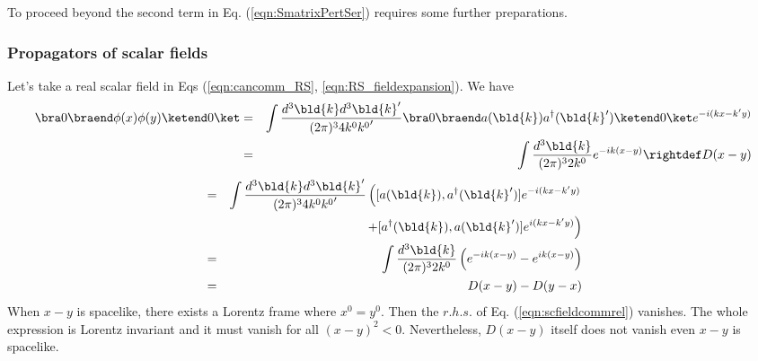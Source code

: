To proceed beyond the second term in Eq. (\ref{eqn:SmatrixPertSer}) requires some
further preparations.

\subsubsection{Propagators of scalar fields}
Let's take a real scalar field in Eqs (\ref{eqn:cancomm_RS}, \ref{eqn:RS_fieldexpansion}).
We have
\begin{eqnarray}
\bra 0 \braend \phi(x) \phi(y) \ketend 0 \ket
&=&
\int \frac{d^3 \bld{k} d^3 \bld{k}'}{(2\pi)^3 4 k^0 {k^0}'} 
\bra 0 \braend a(\bld{k}) a^\dagger(\bld{k}') \ketend 0 \ket
e^{-i(kx - k'y)}
\nonumber\\
&=&
\int \frac{d^3 \bld{k} }{(2\pi)^3 2 k^0} 
e^{-ik(x - y)}
\rightdef
D(x-y)
\end{eqnarray}
\begin{eqnarray}
[\phi(x), \phi(y)]
&=&
\int \frac{d^3 \bld{k} d^3 \bld{k}'}{(2\pi)^3 4 k^0 {k^0}'} 
\left(
[a(\bld{k}), a^\dagger(\bld{k}')]e^{-i(kx - k'y)}
\right.
\nonumber\\
&&
\left.
\hspace{35mm}
+
[a^\dagger(\bld{k}), a(\bld{k}')]e^{i(kx - k'y)}
\right)
\nonumber\\
&=&
\int \frac{d^3 \bld{k} }{(2\pi)^3 2 k^0} 
\left(
e^{-ik(x - y)} - e^{ik(x - y)}
\right)
\nonumber\\
&=&
D(x-y) - D(y-x)
\label{eqn:scfieldcommrel}
\end{eqnarray}
When $x-y$ is spacelike, there exists a Lorentz frame where $x^0 = y^0$.
Then the $r.h.s.$ of Eq. (\ref{eqn:scfieldcommrel}) vanishes. 
The whole expression is Lorentz invariant and it must vanish for all $(x-y)^2 < 0$.
Nevertheless, $D(x-y)$ itself does not vanish even $x-y$ is spacelike.

